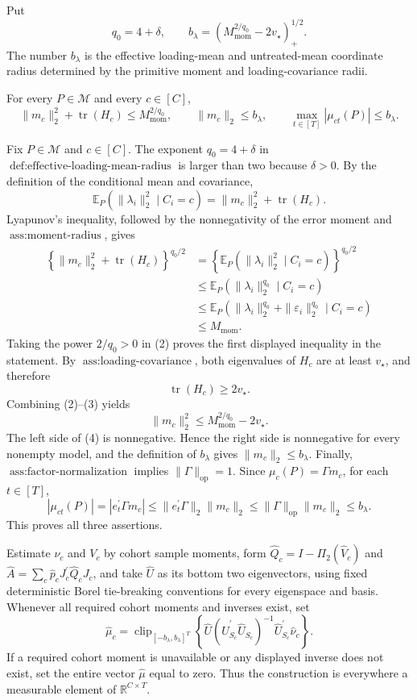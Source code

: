 Put
\[
q_0=4+\delta,
\qquad
b_\lambda=\left(M_{\mathrm{mom}}^{2/q_0}-2v_\star\right)_+^{1/2}.
\]
The number \(b_\lambda\) is the effective loading-mean and untreated-mean coordinate radius determined by the primitive moment and loading-covariance radii.

For every \(P\in\mathcal M\) and every \(c\in[C]\),
\[
\|m_c\|_2^2+\operatorname{tr}(H_c)\le M_{\mathrm{mom}}^{2/q_0},
\qquad
\|m_c\|_2\le b_\lambda,
\qquad
\max_{t\in[T]}|\mu_{ct}(P)|\le b_\lambda.
\]

Fix \(P\in\mathcal M\) and \(c\in[C]\).  The exponent \(q_0=4+\delta\) in \(\operatorname{def:effective\text{-}loading\text{-}mean\text{-}radius}\) is larger than two because \(\delta>0\).  By the definition of the conditional mean and covariance,
\[
\mathbb E_P\!\left(\|\lambda_i\|_2^2\mid C_i=c\right)
=\|m_c\|_2^2+\operatorname{tr}(H_c).
\tag{1}
\]
Lyapunov's inequality, followed by the nonnegativity of the error moment and \(\operatorname{ass:moment\text{-}radius}\), gives
\[
\begin{aligned}
\left\{\|m_c\|_2^2+\operatorname{tr}(H_c)\right\}^{q_0/2}
&=\left\{\mathbb E_P(\|\lambda_i\|_2^2\mid C_i=c)\right\}^{q_0/2}\\
&\le \mathbb E_P(\|\lambda_i\|_2^{q_0}\mid C_i=c)\\
&\le \mathbb E_P(\|\lambda_i\|_2^{q_0}+\|\varepsilon_i\|_2^{q_0}\mid C_i=c)\\
&\le M_{\mathrm{mom}}.
\end{aligned}
\tag{2}
\]
Taking the power \(2/q_0>0\) in (2) proves the first displayed inequality in the statement.  By \(\operatorname{ass:loading\text{-}covariance}\), both eigenvalues of \(H_c\) are at least \(v_\star\), and therefore
\[
\operatorname{tr}(H_c)\ge 2v_\star.
\tag{3}
\]
Combining (2)--(3) yields
\[
\|m_c\|_2^2
\le M_{\mathrm{mom}}^{2/q_0}-2v_\star.
\tag{4}
\]
The left side of (4) is nonnegative.  Hence the right side is nonnegative for every nonempty model, and the definition of \(b_\lambda\) gives \(\|m_c\|_2\le b_\lambda\).  Finally, \(\operatorname{ass:factor\text{-}normalization}\) implies \(\|\Gamma\|_{\mathrm{op}}=1\).  Since \(\mu_c(P)=\Gamma m_c\), for each \(t\in[T]\),
\[
|\mu_{ct}(P)|
=|e_t^{\prime}\Gamma m_c|
\le \|e_t^{\prime}\Gamma\|_2\|m_c\|_2
\le \|\Gamma\|_{\mathrm{op}}\|m_c\|_2
\le b_\lambda.
\]
This proves all three assertions.

Estimate \(\nu_c\) and \(V_c\) by cohort sample moments, form \(\widehat Q_c=I-\Pi_2(\widehat V_c)\) and \(\widehat A=\sum_c\widehat p_cJ_c^{\prime}\widehat Q_cJ_c\), and take \(\widehat U\) as its bottom two eigenvectors, using fixed deterministic Borel tie-breaking conventions for every eigenspace and basis. Whenever all required cohort moments and inverses exist, set
\[
\widehat\mu_c=\operatorname{clip}_{[-b_\lambda,b_\lambda]^T}\!\left\{\widehat U(\widehat U_{S_c}^{\prime}\widehat U_{S_c})^{-1}\widehat U_{S_c}^{\prime}\widehat\nu_c\right\}.
\]
If a required cohort moment is unavailable or any displayed inverse does not exist, set the entire vector \(\widehat\mu\) equal to zero. Thus the construction is everywhere a measurable element of \(\mathbb R^{C\times T}\).

